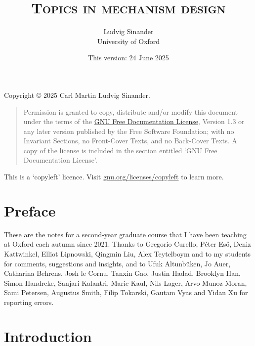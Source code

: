 \documentclass[11pt,letterpaper,reqno,oneside]{book}
\title{\scshape Topics in mechanism design}
\author{Ludvig Sinander \\
University of Oxford}
\date{\small This version: 24 June 2025}
\begin{document}
\maketitle

\pagebreak
\hspace{1pt}\vfill
\noindent
Copyright \copyright{} 2025 Carl Martin Ludvig Sinander.

\begin{quotation}
\noindent
Permission is granted to copy, distribute and/or modify this document under the terms of the \href{https://www.gnu.org/licenses/fdl}{GNU Free Documentation License}, Version 1.3 or any later version published by the Free Software Foundation; with no Invariant Sections, no Front-Cover Texts, and no Back-Cover Texts. A copy of the license is included in the section entitled `GNU
Free Documentation License'.
\end{quotation}

\noindent
This is a `copyleft' licence.
Visit \href{https://www.gnu.org/licenses/copyleft}{gnu.org/licenses/copyleft} to learn more.



\chapter*{Preface}
\label{preface}

These are the notes for a second-year graduate course that I have been teaching at Oxford each autumn since 2021.
Thanks to Gregorio Curello, Péter Es\H{o}, Deniz Kattwinkel, Elliot Lipnowski, Qingmin Liu, Alex Teytelboym and to my students for comments, suggestions and insights,
and to Ufuk Altunbüken, Jo Auer, Catharina Behrens, Josh le Cornu, Tanxin Gao, Justin Hadad, Brooklyn Han, Simon Handreke, Sanjari Kalantri, Marie Kaul, Nils Lager, Arvo Munoz Moran, Sami Petersen, Augustus Smith, Filip Tokarski, Gautam Vyas and Yidan Xu for reporting errors.



\pagebreak
{}
\setcounter{tocdepth}{1}
\tableofcontents
{}



\setcounter{chapter}{-1}
\chapter{Introduction}
\label{ch0}
\end{document}
